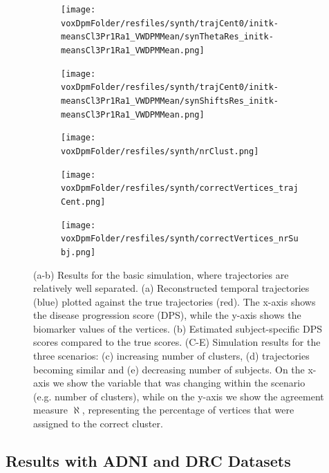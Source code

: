 \begin{figure}
\centering
\begin{subfigure}[b]{0.7\textwidth}
\texttt{[image: \\voxDpmFolder/resfiles/synth/trajCent0/initk-meansCl3Pr1Ra1\_VWDPMMean/synThetaRes\_initk-meansCl3Pr1Ra1\_VWDPMMean.png]}
\caption{}
\label{diveResSynthA}
\end{subfigure}
\begin{subfigure}[b]{0.25\textwidth}
\texttt{[image: \\voxDpmFolder/resfiles/synth/trajCent0/initk-meansCl3Pr1Ra1\_VWDPMMean/synShiftsRes\_initk-meansCl3Pr1Ra1\_VWDPMMean.png]}
\vspace{0.4em}
\caption{}
\label{diveResSynthB}
\end{subfigure}
\begin{subfigure}[b]{0.32\textwidth}
\texttt{[image: \\voxDpmFolder/resfiles/synth/nrClust.png]}
\caption{}
\label{diveResSynthC}
\end{subfigure}
\begin{subfigure}[b]{0.32\textwidth}
\texttt{[image: \\voxDpmFolder/resfiles/synth/correctVertices\_trajCent.png]}
\caption{}
\label{diveResSynthD}
\end{subfigure}
\begin{subfigure}[b]{0.32\textwidth}
\texttt{[image: \\voxDpmFolder/resfiles/synth/correctVertices\_nrSubj.png]}
\caption{}
\label{diveResSynthE}
\end{subfigure}
\caption[DIVE Simulation Results]{(a-b) Results for the basic simulation, where trajectories are relatively well separated. (a) Reconstructed temporal trajectories (blue) plotted against the true trajectories (red). The x-axis shows the disease progression score (DPS), while the y-axis shows the biomarker values of the vertices. (b) Estimated subject-specific DPS scores compared to the true scores. (C-E) Simulation results for the three scenarios: (c) increasing number of clusters, (d) trajectories becoming similar and (e) decreasing number of subjects. On the x-axis we show the variable that was changing within the scenario (e.g. number of clusters), while on the y-axis we show the agreement measure $\aleph$, representing the percentage of vertices that were assigned to the correct cluster.}
\label{diveResSynth}
\end{figure}


\subsection{Results with ADNI and DRC Datasets}
\label{sec:diveResAdniDrc}

